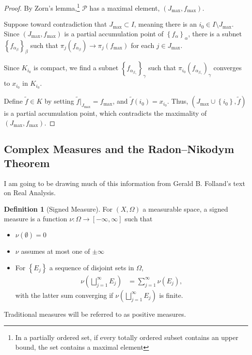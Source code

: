 \documentclass[10pt]{extarticle}
\newcommand{\set}[1]{\left\{#1\right\}}
\theoremstyle{plain}
\theoremstyle{definition}
\newtheorem*{definition}{Definition}
\theoremstyle{note}
\renewcommand{\newline}{\hfill\break}
\begin{document}
\begin{proof}
  By Zorn's lemma,\footnote{In a partially ordered set, if every totally ordered subset contains an upper bound, the set contains a maximal element} $\mathcal{P}$ has a maximal element, $\left(J_{\text{max}},f_{\text{max}}\right)$.\newline

  Suppose toward contradiction that $J_{\text{max}}\subset I$, meaning there is an $i_0\in I\setminus J_{\text{max}}$. Since $\left(J_{\text{max}},f_{\text{max}}\right)$ is a partial accumulation point of $\set{f_{\alpha}}_{\alpha}$, there is a subnet $\set{f_{\alpha_\beta}}_{\beta}$ such that $\pi_{j}\left(f_{\alpha_\beta}\right) \rightarrow \pi_{j}\left(f_{\text{max}}\right)$ for each $j\in J_{\text{max}}$.\newline

  Since $K_{i_0}$ is compact, we find a subnet $\set{f_{\alpha_{\beta_{\gamma}}}}_{\gamma}$ such that $\pi_{i_0}\left(f_{\alpha_{\beta_{\gamma}}}\right)_{\gamma}$ converges to $x_{i_0}$ in $K_{i_0}$.\newline

  Define $\tilde{f} \in K$ by setting $\tilde{f}\vert_{J_{\text{max}}} = f_{\text{max}}$, and $\tilde{f}(i_0) = x_{i_0}$. Thus, $\left(J_{\text{max}}\cup \set{i_0},\tilde{f}\right)$ is a partial accumulation point, which contradicts the maximality of $\left(J_{\text{max}},f_{\text{max}}\right)$.
\end{proof}
\subsection{Complex Measures and the Radon--Nikodym Theorem}%
I am going to be drawing much of this information from Gerald B. Folland's text on Real Analysis.
\begin{definition}[Signed Measure]
  For $(X,\Omega)$ a measurable space, a signed measure is a function $\nu: \Omega \rightarrow [-\infty,\infty]$ such that
  \begin{itemize}
    \item $\nu\left(\emptyset\right) = 0$
    \item $\nu$ assumes at most one of $\pm\infty$
    \item For $\set{E_j}$ a sequence of disjoint sets in $\Omega$,
      \begin{align*}
        \nu\left(\bigsqcup_{j=1}^{\infty}E_j\right) &= \sum_{j=1}^{\infty}\nu\left(E_j\right),
      \end{align*}
      with the latter sum converging if $\nu\left(\bigsqcup_{j=1}^{\infty}E_j\right)$ is finite.
  \end{itemize}
\end{definition}
Traditional measures will be referred to as positive measures.\newline
\end{document}
